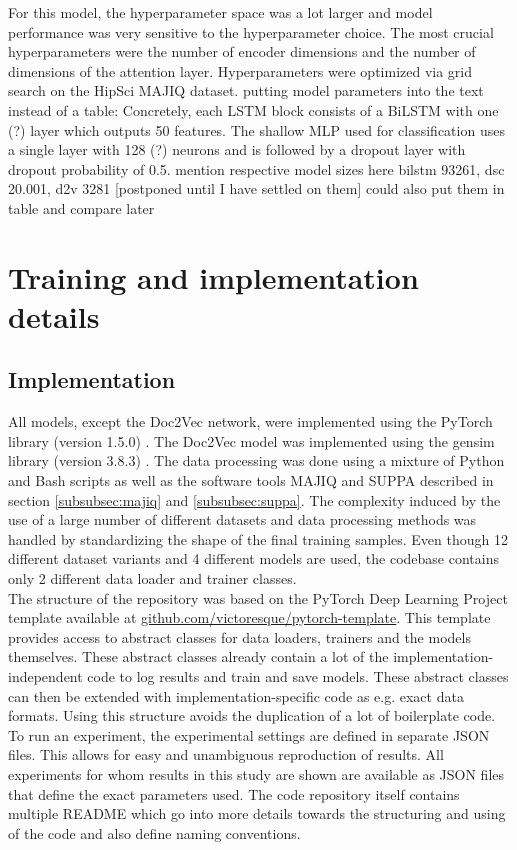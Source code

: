 For this model, the hyperparameter space was a lot larger and model performance was very sensitive to the hyperparameter choice. The most crucial hyperparameters were the number of encoder dimensions and the number of dimensions of the attention layer. Hyperparameters were optimized via grid search on the HipSci MAJIQ dataset.
putting model parameters into the text instead of a table:
Concretely, each LSTM block consists of a BiLSTM with one (?) layer which outputs 50 features.
The shallow MLP used for classification uses a single layer with 128 (?) neurons and is followed by a dropout layer with dropout probability of 0.5.
mention respective model sizes here
bilstm 93261, dsc 20.001, d2v 3281 [postponed until I have settled on them]
could also put them in table and compare later

\section{Training and implementation details}
\subsection{Implementation}

All models, except the Doc2Vec network, were implemented using the PyTorch library (version 1.5.0) \cite{pytorch}. The Doc2Vec model was implemented using the gensim library (version 3.8.3) \cite{gensim}. The data processing was done using a mixture of Python and Bash scripts as well as the software tools MAJIQ and SUPPA described in section \ref{subsubsec:majiq} and \ref{subsubsec:suppa}. The complexity induced by the use of a large number of different datasets and data processing methods was handled by standardizing the shape of the final training samples. Even though 12 different dataset variants and 4 different models are used, the codebase contains only 2 different data loader and trainer classes.\\


The structure of the repository was based on the PyTorch Deep Learning Project template available at \url{github.com/victoresque/pytorch-template}. This template provides access to abstract classes for data loaders, trainers and the models themselves. These abstract classes already contain a lot of the implementation-independent code to log results and train and save models. These abstract classes can then be extended with implementation-specific code as e.g. exact data formats. Using this structure avoids the duplication of a lot of boilerplate code.\\
To run an experiment, the experimental settings are defined in separate JSON files. This allows for easy and unambiguous reproduction of results. All experiments for whom results in this study are shown are available as JSON files that define the exact parameters used.
The code repository itself contains multiple README which go into more details towards the structuring and using of the code and also define naming conventions.\\

